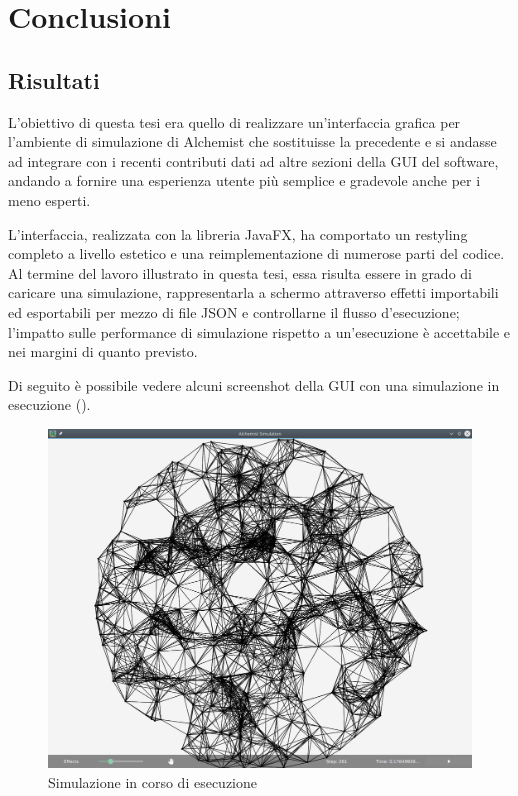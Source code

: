 
\chapter{Conclusioni}\label{ch:conclusioni}
    \section{Risultati}\label{sec:risultati}
        L'obiettivo di questa tesi era quello di realizzare un'interfaccia grafica per l'ambiente di simulazione di Alchemist che sostituisse la precedente e si andasse ad integrare con i recenti contributi dati ad altre sezioni della GUI del software, andando a fornire una esperienza utente più semplice e gradevole anche per i meno esperti.

        L'interfaccia, realizzata con la libreria JavaFX, ha comportato un restyling completo a livello estetico e una reimplementazione di numerose parti del codice.
        Al termine del lavoro illustrato in questa tesi, essa risulta essere in grado di caricare una simulazione, rappresentarla a schermo attraverso effetti importabili ed esportabili per mezzo di file JSON e controllarne il flusso d'esecuzione; l'impatto sulle performance di simulazione rispetto a un'esecuzione  è accettabile e nei margini di quanto previsto.

        Di seguito è possibile vedere alcuni screenshot della GUI con una simulazione in esecuzione ().

        \begin{figure}[htbp]
            \centering
            \includegraphics[scale=0.45]{img/withNodes/simWithNodes}
            \caption{Simulazione in corso di esecuzione}
            \label{fig:simWithNodes}
        \end{figure}

